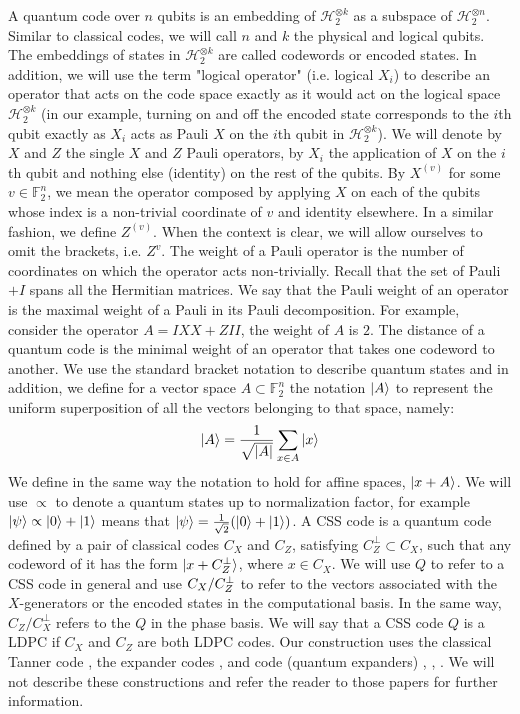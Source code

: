 A quantum code over $n$ qubits is an embedding of $\mathcal{H}_{2}^{\otimes k}$ as a subspace of $\mathcal{H}_{2}^{\otimes n}$. Similar to classical codes, we will call $n$ and $k$ the physical and logical qubits. The embeddings of states in $\mathcal{H}_{2}^{\otimes k}$ are called codewords or encoded states. In addition, we will use the term "logical operator" (i.e. logical $X_{i}$) to describe an operator that acts on the code space exactly as it would act on the logical space $\mathcal{H}_{2}^{\otimes k}$ (in our example, turning on and off the encoded state corresponds to the $i$th qubit exactly as $X_{i}$ acts as Pauli $X$ on the $i$th qubit in $\mathcal{H}_{2}^{\otimes k}$). We will denote by $X$ and $Z$ the single $X$ and $Z$ Pauli operators, by $X_{i}$ the application of $X$ on the $i$th qubit and nothing else (identity) on the rest of the qubits. By $X^{(v)}$ for some $v \in \mathbb{F}_{2}^{n}$, we mean the operator composed by applying $X$ on each of the qubits whose index is a non-trivial coordinate of $v$ and identity elsewhere. In a similar fashion, we define $Z^{(v)}$. When the context is clear, we will allow ourselves to omit the brackets, i.e. $Z^{v}$. The weight of a Pauli operator is the number of coordinates on which the operator acts non-trivially. Recall that the set of Pauli $+ I$ spans all the Hermitian matrices. We say that the Pauli weight of an operator is the maximal weight of a Pauli in its Pauli decomposition. For example, consider the operator $A = IXX + ZII$, the weight of $A$ is $2$. The distance of a quantum code is the minimal weight of an operator that takes one codeword to another. We use the standard bracket notation to describe quantum states and in addition, we define for a vector space $A \subset \mathbb{F}_{2}^{n}$ the notation $\ket{A}$ to represent the uniform superposition of all the vectors belonging to that space, namely: \begin{equation*}
  \begin{split}
\ket{A} = \frac{1}{\sqrt{|A|}}\sum_{x \in A}{\ket{x}}
  \end{split}
\end{equation*}
We define in the same way the notation to hold for affine spaces, $\ket{x +A}$. We will use $\propto$ to denote a quantum states up to normalization factor, for example $\ket{\psi} \propto \ket{0} + \ket{1}$ means that $\ket{\psi} = \frac{1}{\sqrt{2}}(\ket{0} + \ket{1})$.
A CSS code is a quantum code defined by a pair of classical codes $C_{X}$ and $C_{Z}$, satisfying $C_{Z}^{\perp} \subset C_{X}$, such that any codeword of it has the form $\ket{x + C_{Z}^\perp}$, where $x \in C_{X}$. We will use $Q$ to refer to a CSS code in general and use $C_{X}/C_{Z}^\perp$ to refer to the vectors associated with the $X$-generators or the encoded states in the computational basis. In the same way, $C_{Z}/C_{X}^{\perp}$ refers to the $Q$ in the phase basis. We will say that a CSS code $Q$ is a LDPC if $C_{X}$ and $C_{Z}$ are both LDPC codes. Our construction uses the classical Tanner code \cite{Tanner}, the expander codes \cite{ExpanderCodes}, and \Hyp  code (quantum expanders) \cite{Leverrier_2015}, \cite{Tillich_2014}, \cite{overheadofquantumerrorcorrection}. We will not describe these constructions and refer the reader to those papers for further information.


